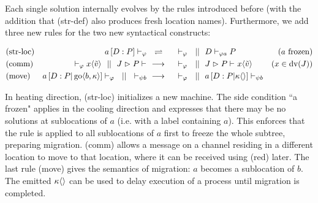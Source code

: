 Each single solution internally evolves by the rules introduced before
(with the addition that (str-def) also produces fresh location names).
Furthermore, we add three new rules for the two new syntactical constructs:

\begin{align*}
  \drchamequ{str-loc}{(a \ \text{frozen)}}{
    \drchamcnf{\varphi}{\jloc{a}{D}{P}}{}
  }{
    \drchamcnf{\varphi}{}{}
    \drchampar
    \drchamcnf{\varphi a}{D}{P}
  }
  \\
  \drchamred{comm}{(x \in \dv{J})}{
    \drchamcnf{\varphi}{}{\jsnd{x}{\tilde{v}}}
    \drchampar
    \drchamcnf{}{\jrct{J}{P}}{}
  }{
    \drchamcnf{\varphi}{}{}
    \drchampar
    \drchamcnf{}{\jrct{J}{P}}{\jsnd{x}{\tilde{v}}}
  }
  \\
  \drchamred{move}{}{
    \drchamcnf{\varphi}{\jloc{a}{D}{P \jpar \jgo{b}{\kappa}}}{}
    \drchampar
    \drchamcnf{\psi b}{}{}
  }{
    \drchamcnf{\varphi}{}{}
    \drchampar
    \drchamcnf{\psi b}{\jloc{a}{D}{P \jpar \jsnd{\kappa}{}}}{}
  }
\end{align*}

In heating direction, (str-loc) initializes a new machine.
The side condition ``a frozen" applies in the cooling direction
and expresses that there may be no solutions at sublocations of $a$
(i.e. with a label containing $a$).
This enforces that the rule is applied to all sublocations of $a$ first
to freeze the whole subtree, preparing migration.
(comm) allows a message on a channel residing in a different location
to move to that location, where it can be received using (red) later.
The last rule (move) gives the semantics of migration: $a$ becomes a sublocation
of $b$. The emitted $\jsnd{\kappa}{}$ can be used to delay execution of a
process until migration is completed.
